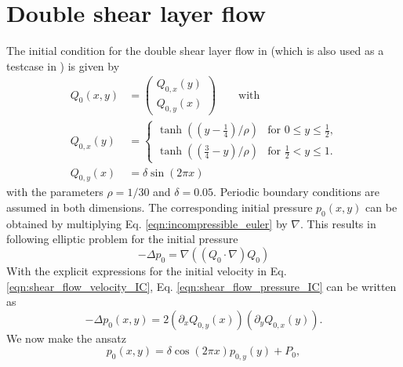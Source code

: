 \documentclass[11pt]{article}
\begin{document}
\section{Double shear layer flow}\label{sec:shear_test}
The initial condition for the double shear layer flow in \cite{Bell1989} (which is also used as a testcase in \cite{Guzman2016}) is given by
\begin{equation}
    \begin{aligned}
        Q_0(x,y)   & = \begin{pmatrix}
                           Q_{0,x}(y) \\
                           Q_{0,y}(x)
                       \end{pmatrix}    \qquad\text{with}                                                               \\
        Q_{0,x}(y) & = \begin{cases}
                           \tanh\left(\left(y-\frac{1}{4}\right)/\rho\right) & \text{for $0\le y\le \frac{1}{2}$,} \\
                           \tanh\left(\left(\frac{3}{4}-y\right)/\rho\right) & \text{for $\frac{1}{2}<y\le 1$.}
                       \end{cases} \\
        Q_{0,y}(x) & = \delta \sin(2\pi x)
    \end{aligned}
    \label{eqn:shear_flow_velocity_IC}
\end{equation}
with the parameters $\rho=1/30$ and $\delta=0.05$.
Periodic boundary conditions are assumed in both dimensions. The corresponding initial pressure $p_0(x,y)$ can be obtained by multiplying Eq. \eqref{eqn:incompressible_euler} by $\nabla$. This results in following elliptic problem for the initial pressure
\begin{equation}
    - \Delta p_0 = \nabla \left( (Q_0 \cdot \nabla) Q_0 \right) \label{eqn:shear_flow_pressure_IC}
\end{equation}
With the explicit expressions for the initial velocity in Eq. \eqref{eqn:shear_flow_velocity_IC}, Eq. \eqref{eqn:shear_flow_pressure_IC} can be written as
\begin{equation}
    - \Delta p_0(x,y) = 2\left(\partial_x Q_{0,y}(x)\right)\left(\partial_y Q_{0,x}(y)\right).
    \label{eqn:shear_flow_IP_equation}
\end{equation}
We now make the ansatz
\begin{equation}
    p_0(x,y) =  \delta \cos(2\pi x)p_{0,y}(y)+P_0,\label{eqn:shear_flow_ansatz}
\end{equation}
\end{document}
